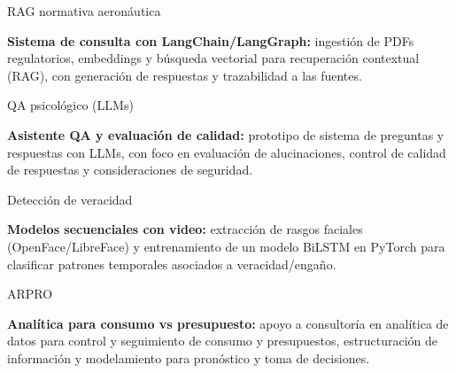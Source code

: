 \begin{cvskills}
  \cvskill
    {\begin{minipage}[t]{0.28\linewidth}RAG normativa aeronáutica\end{minipage}}
    {\parbox[t]{0.72\linewidth}{\textbf{Sistema de consulta con LangChain/LangGraph:} ingestión de PDFs regulatorios, embeddings y búsqueda vectorial para recuperación contextual (RAG), con generación de respuestas y trazabilidad a las fuentes.}}

  \cvskill
    {\begin{minipage}[t]{0.28\linewidth}QA psicológico (LLMs)\end{minipage}}
    {\parbox[t]{0.72\linewidth}{\textbf{Asistente QA y evaluación de calidad:} prototipo de sistema de preguntas y respuestas con LLMs, con foco en evaluación de alucinaciones, control de calidad de respuestas y consideraciones de seguridad.}}

  \cvskill
    {\begin{minipage}[t]{0.28\linewidth}Detección de veracidad\end{minipage}}
    {\parbox[t]{0.72\linewidth}{\textbf{Modelos secuenciales con video:} extracción de rasgos faciales (OpenFace/LibreFace) y entrenamiento de un modelo BiLSTM en PyTorch para clasificar patrones temporales asociados a veracidad/engaño.}}

  \cvskill
    {\begin{minipage}[t]{0.28\linewidth}ARPRO\end{minipage}}
    {\parbox[t]{0.72\linewidth}{\textbf{Analítica para consumo vs presupuesto:} apoyo a consultoría en analítica de datos para control y seguimiento de consumo y presupuestos, estructuración de información y modelamiento para pronóstico y toma de decisiones.}}

\end{cvskills}


